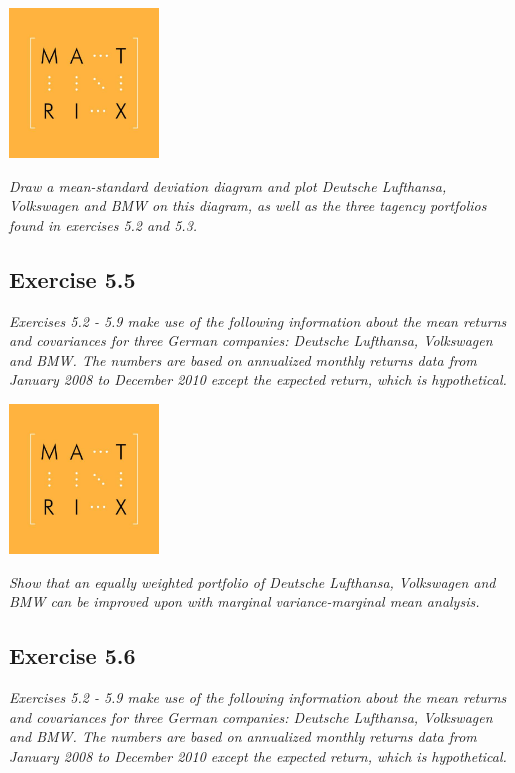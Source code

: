 \documentclass[]{book}
\theoremstyle{definition}
\theoremstyle{definition}
\theoremstyle{remark}
\begin{document}
\begin{center}\includegraphics[width=150px]{figures/matrix} \end{center}

\emph{Draw a mean-standard deviation diagram and plot Deutsche
Lufthansa, Volkswagen and BMW on this diagram, as well as the three
tagency portfolios found in exercises 5.2 and 5.3.} \citep[p.160]{book}

\subsection{Exercise 5.5}\label{exercise-5.5}

\emph{Exercises 5.2 - 5.9 make use of the following information about
the mean returns and covariances for three German companies: Deutsche
Lufthansa, Volkswagen and BMW. The numbers are based on annualized
monthly returns data from January 2008 to December 2010 except the
expected return, which is hypothetical.} \citep[p.159]{book}

\begin{center}\includegraphics[width=150px]{figures/matrix} \end{center}

\emph{Show that an equally weighted portfolio of Deutsche Lufthansa,
Volkswagen and BMW can be improved upon with marginal variance-marginal
mean analysis.} \citep[p.160]{book}

\subsection{Exercise 5.6}\label{exercise-5.6}

\emph{Exercises 5.2 - 5.9 make use of the following information about
the mean returns and covariances for three German companies: Deutsche
Lufthansa, Volkswagen and BMW. The numbers are based on annualized
monthly returns data from January 2008 to December 2010 except the
expected return, which is hypothetical.} \citep[p.159]{book}
\end{document}
